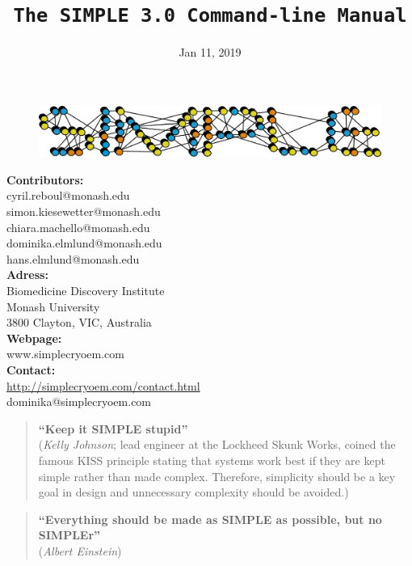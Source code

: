 \documentclass[a4paper,11pt]{article}
\newcommand{\prgname}[1]{\textcolor{NavyBlue}{\texttt{#1}}}
\begin{document}
\begin{figure}
\centering
\includegraphics[keepaspectratio=true,scale=0.6]{../SIMPLE_logo/rawlogo}
\end{figure}

\title{\prgname{The SIMPLE 3.0 Command-line Manual}}
\date{Jan 11, 2019}
\maketitle

\vspace{1em}
\begin{minipage}[ht]{0.50\textwidth}
\textbf{Contributors:}\\
cyril.reboul@monash.edu\\
simon.kiesewetter@monash.edu\\
chiara.machello@monash.edu\\
dominika.elmlund@monash.edu\\
hans.elmlund@monash.edu\\
\textbf{Adress:}\\
Biomedicine Discovery Institute\\
Monash University\\
3800 Clayton, VIC, Australia\\
\textbf{Webpage:}\\
www.simplecryoem.com\\
\textbf{Contact:}\\
\url{http://simplecryoem.com/contact.html}\\
dominika@simplecryoem.com\\
\end{minipage}
\vspace{20pt}

\begin{quote}
\textbf{``Keep it SIMPLE stupid''}\\(\textit{Kelly Johnson}; lead engineer at the Lockheed Skunk Works, coined the famous KISS principle stating that systems work best if they are kept simple rather than made complex. Therefore, simplicity should be a key goal in design and unnecessary complexity should be avoided.)
\end{quote}

\begin{quote}
\textbf{``Everything should be made as SIMPLE as possible, but no SIMPLEr''}\\(\textit{Albert Einstein})
\end{quote}
\end{document}
